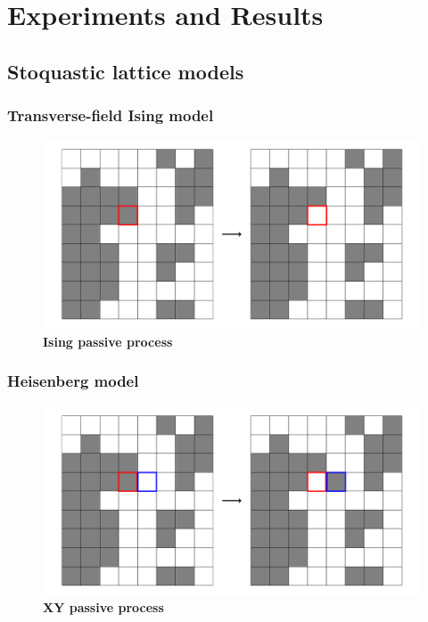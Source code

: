 
\chapter{Experiments and Results}
\label{chapter6}

\ifpdf
\graphicspath{{Chapter6/Figs/Raster/}{Chapter6/Figs/PDF/}{Chapter6/Figs/}}
\else
\graphicspath{{Chapter6/Figs/Vector/}{Chapter6/Figs/}}
\fi

\section{Stoquastic lattice models}
\subsection{Transverse-field Ising model}
\label{sec:res-im}
\begin{figure}[h]
	\centering
	\includegraphics[width=0.7\linewidth]{Chapter6/Figs/Vector/ising_passive}
	\caption[Ising passive process]{\textbf{Ising passive process}}	
	\label{fig:isingpassive}
\end{figure}



\subsection{Heisenberg model}
\label{sec:res-hm}
\begin{figure}[h]
	\centering
	\includegraphics[width=0.7\linewidth]{Chapter6/Figs/Vector/xy_passive}
	\caption[XY passive process]{\textbf{XY passive process}}
	\label{fig:xypassive}
\end{figure}

